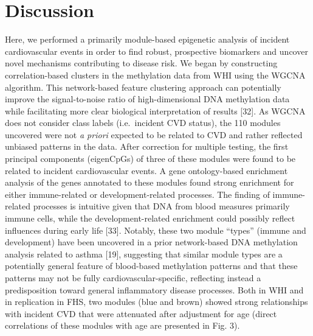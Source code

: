 \documentclass[]{bmcart}
\begin{document}
\section{Discussion}\label{discussion}

Here, we performed a primarily module-based epigenetic analysis of
incident cardiovascular events in order to find robust, prospective
biomarkers and uncover novel mechanisms contributing to disease risk. We
began by constructing correlation-based clusters in the methylation data
from WHI using the WGCNA algorithm. This network-based feature
clustering approach can potentially improve the signal-to-noise ratio of
high-dimensional DNA methylation data while facilitating more clear
biological interpretation of results {[}32{]}. As WGCNA does not
consider class labels (i.e.~incident CVD status), the 110 modules
uncovered were not \emph{a priori} expected to be related to CVD and
rather reflected unbiased patterns in the data. After correction for
multiple testing, the first principal components (eigenCpGs) of three of
these modules were found to be related to incident cardiovascular
events. A gene ontology-based enrichment analysis of the genes annotated
to these modules found strong enrichment for either immune-related or
development-related processes. The finding of immune-related processes
is intuitive given that DNA from blood measures primarily immune cells,
while the development-related enrichment could possibly reflect
influences during early life {[}33{]}. Notably, these two module
``types'' (immune and development) have been uncovered in a prior
network-based DNA methylation analysis related to asthma {[}19{]},
suggesting that similar module types are a potentially general feature
of blood-based methylation patterns and that these patterns may not be
fully cardiovascular-specific, reflecting instead a predisposition
toward general inflammatory disease processes. Both in WHI and in
replication in FHS, two modules (blue and brown) showed strong
relationships with incident CVD that were attenuated after adjustment
for age (direct correlations of these modules with age are presented in
Fig. 3).
\end{document}
